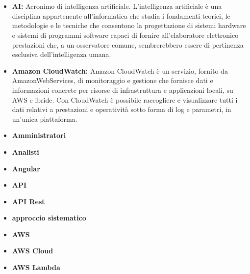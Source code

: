 \section{}
\begin{itemize}
    \item \textbf{AI:} Acronimo di intelligenza artificiale. L'intelligenza artificiale è una disciplina appartenente all'informatica che studia i fondamenti teorici, le metodologie e le tecniche che consentono la progettazione di sistemi hardware e sistemi di programmi software capaci di fornire all'elaboratore elettronico prestazioni che, a un osservatore comune, sembrerebbero essere di pertinenza esclusiva dell’intelligenza umana.
    \item \textbf{Amazon CloudWatch:} Amazon CloudWatch è un servizio, fornito da AmazonWebServices, di monitoraggio e gestione che fornisce dati e informazioni concrete per risorse di infrastruttura e applicazioni locali, su AWS e ibride. Con CloudWatch è possibile raccogliere e visualizzare tutti i dati relativi a prestazioni e operatività sotto forma di log e parametri, in un'unica piattaforma.
    \item \textbf{Amministratori}
    \item \textbf{Analisti}
    \item \textbf{Angular}
    \item \textbf{API}
    \item \textbf{API Rest}
    \item \textbf{approccio sistematico}
    \item \textbf{AWS}
    \item \textbf{AWS Cloud}
    \item \textbf{AWS Lambda}

\end{itemize}
\newpage
